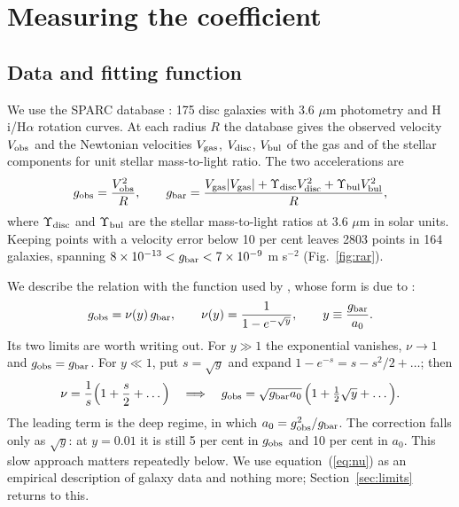 \documentclass[fleqn,usenatbib]{mnras}
\begin{document}
\section{Measuring the coefficient}
\label{sec:kappa}
\subsection{Data and fitting function}
We use the SPARC database \citep{Lelli2016}: 175 disc galaxies with 3.6 $\mu$m photometry and H\,{\sc i}/H$\alpha$ rotation curves. At each radius $R$ the database gives the observed velocity $V_{\rm obs}$ and the Newtonian velocities $V_{\rm gas}$, $V_{\rm disc}$, $V_{\rm bul}$ of the gas and of the stellar components for unit stellar mass-to-light ratio. The two accelerations are
\begin{equation}
g_{\rm obs}=\frac{V_{\rm obs}^2}{R},\qquad
g_{\rm bar}=\frac{V_{\rm gas}|V_{\rm gas}|+\Upsilon_{\rm disc}V_{\rm disc}^2+\Upsilon_{\rm bul}V_{\rm bul}^2}{R},
\label{eq:gdef}
\end{equation}
where $\Upsilon_{\rm disc}$ and $\Upsilon_{\rm bul}$ are the stellar mass-to-light ratios at 3.6 $\mu$m in solar units. Keeping points with a velocity error below 10 per cent leaves 2803 points in 164 galaxies, spanning $8\times10^{-13}<g_{\rm bar}<7\times10^{-9}$ m s$^{-2}$ (Fig.~\ref{fig:rar}).

We describe the relation with the function used by \citet{McGaugh2016}, whose form is due to \citet{MilgromSanders2008}:
\begin{equation}
g_{\rm obs}=\nu(y)\,g_{\rm bar},\qquad \nu(y)=\frac{1}{1-e^{-\sqrt y}},\qquad y\equiv\frac{g_{\rm bar}}{a_0}.
\label{eq:nu}
\end{equation}
Its two limits are worth writing out. For $y\gg1$ the exponential vanishes, $\nu\to1$ and $g_{\rm obs}=g_{\rm bar}$. For $y\ll1$, put $s=\sqrt y$ and expand $1-e^{-s}=s-s^2/2+\ldots$; then
\begin{equation}
\nu=\frac{1}{s}\Big(1+\frac{s}{2}+\ldots\Big)\quad\Longrightarrow\quad g_{\rm obs}=\sqrt{g_{\rm bar}a_0}\,\Big(1+\tfrac12\sqrt y+\ldots\Big).
\label{eq:deep}
\end{equation}
The leading term is the deep regime, in which $a_0=g_{\rm obs}^2/g_{\rm bar}$. The correction falls only as $\sqrt y$: at $y=0.01$ it is still 5 per cent in $g_{\rm obs}$ and 10 per cent in $a_0$. This slow approach matters repeatedly below. We use equation~(\ref{eq:nu}) as an empirical description of galaxy data and nothing more; Section~\ref{sec:limits} returns to this.
\end{document}
